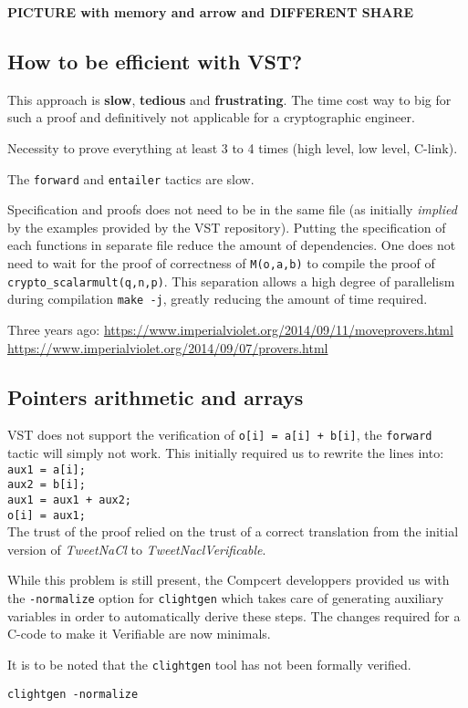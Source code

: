 \textbf{PICTURE with memory and arrow and DIFFERENT SHARE}

\subsection{How to be efficient with VST?}

This approach is \textbf{slow}, \textbf{tedious} and \textbf{frustrating}.
The time cost way to big for such a proof and definitively not applicable for a
cryptographic engineer.

Necessity to prove everything at least 3 to 4 times (high level, low level, C-link).

The \texttt{forward} and \texttt{entailer} tactics are slow.

Specification and proofs does not need to be in the same file (as initially \textit{implied}
by the examples provided by the VST repository). Putting the specification of each
functions in separate file reduce the amount of dependencies. One does not need
to wait for the proof of correctness of \texttt{M(o,a,b)} to compile the proof of \texttt{crypto\_scalarmult(q,n,p)}.
This separation allows a high degree of parallelism during compilation \texttt{make -j},
greatly reducing the amount of time required.

Three years ago:
\url{https://www.imperialviolet.org/2014/09/11/moveprovers.html}
\url{https://www.imperialviolet.org/2014/09/07/provers.html}

\subsection{Pointers arithmetic and arrays}

VST does not support the verification of \texttt{o[i] = a[i] + b[i]},
the \texttt{forward} tactic will simply not work. This initially required us to
rewrite the lines into:\\
\texttt{aux1 = a[i];\\
aux2 = b[i];\\
aux1 = aux1 + aux2;\\
o[i] = aux1;}\\
The trust of the proof relied on the trust of a correct translation from the
initial version of \textit{TweetNaCl} to \textit{TweetNaclVerificable}.

While this problem is still present, the Compcert developpers provided us with
the \texttt{-normalize} option for \texttt{clightgen} which takes care of
generating auxiliary variables in order to automatically derive these steps.
The changes required for a C-code to make it Verifiable are now minimals.

It is to be noted that the \texttt{clightgen} tool has not been formally verified.

\texttt{clightgen -normalize}
